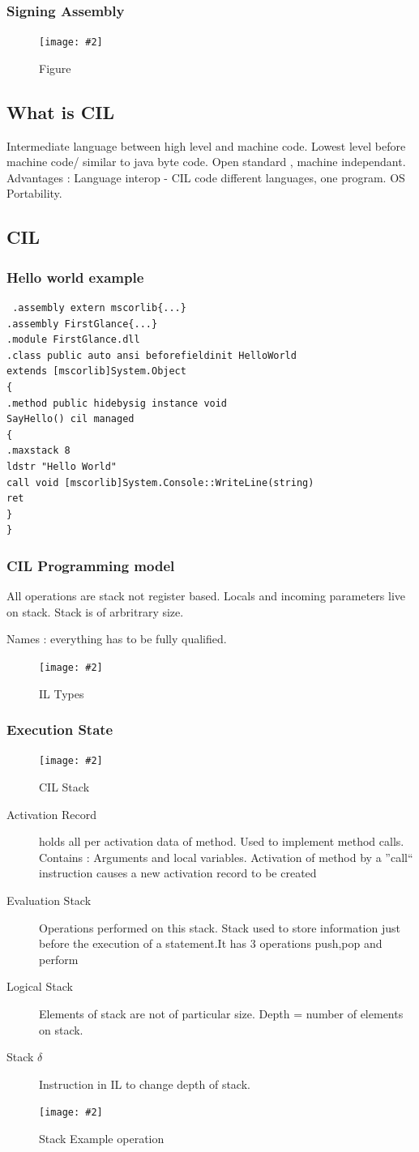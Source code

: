 \documentclass[a4paper,10pt]{scrartcl}
\newcommand{\pic}[2][Figure]{
  \begin{figure}[h!]
   \centering
   \texttt{[image: \#2]}
   \caption{{#1}}
  \end{figure}
}
\begin{document}
\subsubsection{Signing Assembly}
\pic{signgac.png}


\subsection{What is CIL}
Intermediate language between high level and machine code.
Lowest level before machine code/ similar to java byte code. Open standard , machine independant.
Advantages : Language interop - CIL code different languages, one program.
OS Portability.

\subsection{CIL}
\subsubsection{Hello world example}
\begin{lstlisting}
 .assembly extern mscorlib{...}
.assembly FirstGlance{...}
.module FirstGlance.dll
.class public auto ansi beforefieldinit HelloWorld
extends [mscorlib]System.Object
{
.method public hidebysig instance void
SayHello() cil managed
{
.maxstack 8
ldstr "Hello World"
call void [mscorlib]System.Console::WriteLine(string)
ret
}
}

\end{lstlisting}

\subsubsection{CIL Programming model}
All operations are stack not register based. Locals and incoming parameters live on stack.
Stack is of arbritrary size.

Names : everything has to be fully qualified.
\pic[IL Types]{cilnames.png}

\subsubsection{Execution State}
\pic[CIL Stack]{cilstack1.png}
\begin{description}
 \item [Activation Record] holds all per activation data of method. Used to implement method calls. 
 Contains : Arguments and local variables. Activation of method by a ''call`` instruction causes a new activation record to be created
 \item [Evaluation Stack] Operations performed on this stack. Stack used to store information just before the execution of a statement.It has 3 operations push,pop and perform
 \item [Logical Stack] Elements of stack are not of particular size. Depth = number of elements on stack.
 \item [Stack $\delta$] Instruction in IL to change depth of stack.
\end{description}
\pic[Stack Example operation]{stackexample.png}
\end{document}
